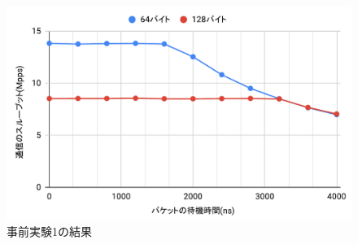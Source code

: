 \begin{figure}[htb]
  \centering
  \includegraphics[width=\columnwidth]{pictures/PreExperimentOneResult.pdf}
  \caption{事前実験1の結果}
  \label{fig:PreExperimentOneResult}
\end{figure}

